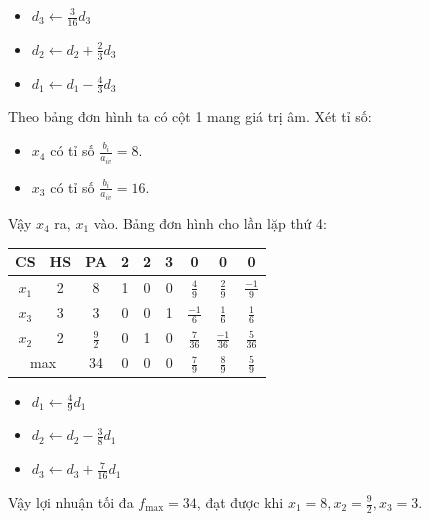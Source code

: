 \documentclass[12pt]{article}
\begin{document}
\begin{itemize}
\item $\displaystyle d_3 \leftarrow \frac{3}{16}d_3$
\item $\displaystyle d_2 \leftarrow d_2 + \frac{2}{3}d_3$
\item $\displaystyle d_1 \leftarrow d_1 - \frac{4}{3}d_3$
\end{itemize}
Theo bảng đơn hình ta có cột 1 mang giá trị âm. Xét tỉ số:
\begin{itemize}
\item $x_4$ có tỉ số $\displaystyle \frac{b_i}{a_{iv}} = 8$.
\item $x_3$ có tỉ số $\displaystyle \frac{b_i}{a_{iv}} = 16$.
\end{itemize}
Vậy $x_4$ ra, $x_1$ vào. Bảng đơn hình cho lần lặp thứ 4:
\begin{table}[H]
\centering
\begin{tabular}{|c|c|c|c|c|c|c|c|c|}
\hline
CS & HS & PA & 2 & 2 & 3 & 0 & 0 & 0 \\
\hline
$x_1$ & 2 & 8 & 1 & 0 & 0 & $\frac{4}{9}$ & $\frac{2}{9}$ & $\frac{-1}{9}$ \\
$x_3$ & 3 & 3 & 0 & 0 & 1 & $\frac{-1}{6}$ & $ \frac{1}{6}$ & $\frac{1}{6}$ \\
$x_2$ & 2 & $\frac{9}{2}$ & 0 & 1 & 0 & $\frac{7}{36}$ & $\frac{-1}{36}$ & $\frac{5}{36}$ \\
\hline
\multicolumn{2}{|c|}{max}
& 34 & 0 & 0 & 0 & $\frac{7}{9}$ & $\frac{8}{9}$ & $\frac{5}{9}$ \\
\hline
\end{tabular}
\end{table}
\begin{itemize}
\item $\displaystyle d_1 \leftarrow \frac{4}{9}d_1$
\item $\displaystyle d_2 \leftarrow d_2 - \frac{3}{8}d_1$ 
\item $\displaystyle d_3 \leftarrow d_3 + \frac{7}{16}d_1$ 
\end{itemize}
Vậy lợi nhuận tối đa $f_{\max} = 34$, đạt được khi $\displaystyle x_1 = 8, x_2 = \frac{9}{2}, x_3 = 3$.
\end{document}
